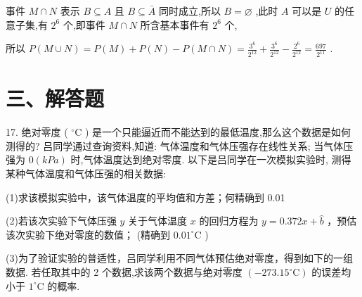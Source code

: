\documentclass[10pt]{article}
\newcommand*\circled[1]{\tikz[baseline=(char.base)]{\node[shape=circle,draw,inner sep=1.5pt] (char) {\small #1};}}
\begin{document}
事件 \(M \cap  N\) 表示 \(B \subseteq  A\) 且 \(B \subseteq  \bar{A}\) 同时成立,所以 \(B = \varnothing\) ,此时 \(A\) 可以是 \(U\) 的任意子集,有 \({2}^{6}\) 个,即事件 \(M \cap  N\) 所含基本事件有 \({2}^{6}\) 个,

所以 \(P\left( {M \cup  N}\right)  = P\left( M\right)  + P\left( N\right)  - P\left( {M \cap  N}\right)  = \frac{{3}^{6}}{{2}^{12}} + \frac{{3}^{6}}{{2}^{12}} - \frac{{2}^{6}}{{2}^{12}} = \frac{697}{{2}^{11}}\) .

\section*{三、解答题}

17. 绝对零度 ( \({}^{ \circ  }\mathrm{C}\) ) 是一个只能逼近而不能达到的最低温度,那么这个数据是如何测得的? 吕同学通过查询资料,知道:  \circled{1} 气体温度和气体压强存在线性关系;  \circled{2} 当气体压强为 \(0\left( {kPa}\right)\) 时,气体温度达到绝对零度. 以下是吕同学在一次模拟实验时, 测得某种气体温度和气体压强的相关数据:

\begin{center}
\end{center}

(1)求该模拟实验中，该气体温度的平均值和方差；何精确到 0.01

(2)若该次实验下气体压强 \(y\) 关于气体温度 \(x\) 的回归方程为 \(y = {0.372x} + \widehat{b}\) ，预估该次实验下绝对零度的数值； (精确到 \({0.01}^{ \circ  }\mathrm{C}\) )

(3)为了验证实验的普适性，吕同学利用不同气体预估绝对零度，得到如下的一组数据. 若任取其中的 2 个数据,求该两个数据与绝对零度 \(\left( {-{273.15}^{ \circ  }\mathrm{C}}\right)\) 的误差均小于 \({1}^{ \circ  }\mathrm{C}\) 的概率.

\begin{center}
\end{center}
\end{document}
